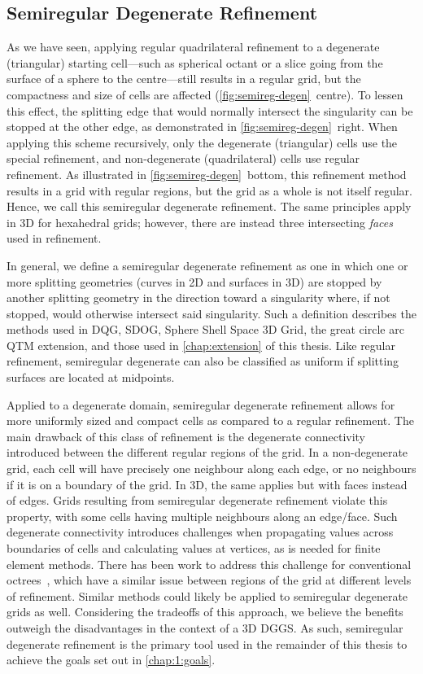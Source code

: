 \subsection{Semiregular Degenerate Refinement} \label{chap:3:semiregDegen}
As we have seen, applying regular quadrilateral refinement to a degenerate (triangular) starting cell---such as spherical octant or a slice going from the surface of a sphere to the centre---still results in a regular grid, but the compactness and size of cells are affected (\cref{fig:semireg-degen}~centre).
To lessen this effect, the splitting edge that would normally intersect the singularity can be stopped at the other edge, as demonstrated in \cref{fig:semireg-degen}~right.
When applying this scheme recursively, only the degenerate (triangular) cells use the special refinement, and non-degenerate (quadrilateral) cells use regular refinement.
As illustrated in \cref{fig:semireg-degen}~bottom, this refinement method results in a grid with regular regions, but the grid as a whole is not itself regular.
Hence, we call this semiregular degenerate refinement.
The same principles apply in 3D for hexahedral grids; however, there are instead three intersecting \textit{faces} used in refinement.


In general, we define a semiregular degenerate refinement as one in which one or more splitting geometries (curves in 2D and surfaces in 3D) are stopped by another splitting geometry in the direction toward a singularity where, if not stopped, would otherwise intersect said singularity.
Such a definition describes the methods used in DQG, SDOG, Sphere Shell Space 3D Grid, the great circle arc QTM extension, and those used in \cref{chap:extension} of this thesis.
Like regular refinement, semiregular degenerate can also be classified as uniform if splitting surfaces are located at midpoints.


Applied to a degenerate domain, semiregular degenerate refinement allows for more uniformly sized and compact cells as compared to a regular refinement.
The main drawback of this class of refinement is the degenerate connectivity introduced between the different regular regions of the grid.
In a non-degenerate grid, each cell will have precisely one neighbour along each edge, or no neighbours if it is on a boundary of the grid.
In 3D, the same applies but with faces instead of edges.
Grids resulting from semiregular degenerate refinement violate this property, with some cells having multiple neighbours along an edge/face.
Such degenerate connectivity introduces challenges when propagating values across boundaries of cells and calculating values at vertices, as is needed for finite element methods.
There has been work to address this challenge for conventional octrees~\cite{braun2008douar}, which have a similar issue between regions of the grid at different levels of refinement.
Similar methods could likely be applied to semiregular degenerate grids as well.
Considering the tradeoffs of this approach, we believe the benefits outweigh the disadvantages in the context of a 3D DGGS.
As such, semiregular degenerate refinement is the primary tool used in the remainder of this thesis to achieve the goals set out in \cref{chap:1:goals}.
